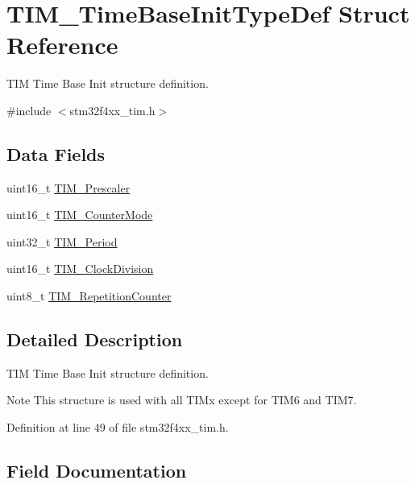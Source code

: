 \hypertarget{struct_t_i_m___time_base_init_type_def}{}\section{T\+I\+M\+\_\+\+Time\+Base\+Init\+Type\+Def Struct Reference}
\label{struct_t_i_m___time_base_init_type_def}


T\+IM Time Base Init structure definition.  




{\ttfamily \#include $<$stm32f4xx\+\_\+tim.\+h$>$}

\subsection*{Data Fields}
\begin{DoxyCompactItemize}
\item 
uint16\+\_\+t \hyperlink{struct_t_i_m___time_base_init_type_def_a30c6857997a4ddd7d3d66fd3a8907c37}{T\+I\+M\+\_\+\+Prescaler}
\item 
uint16\+\_\+t \hyperlink{struct_t_i_m___time_base_init_type_def_adfc97c66bfce30e74ce779ab04c156e9}{T\+I\+M\+\_\+\+Counter\+Mode}
\item 
uint32\+\_\+t \hyperlink{struct_t_i_m___time_base_init_type_def_a642ee05352126af48248167939742034}{T\+I\+M\+\_\+\+Period}
\item 
uint16\+\_\+t \hyperlink{struct_t_i_m___time_base_init_type_def_a2142bf86a7116c8c98ab015d5606fc98}{T\+I\+M\+\_\+\+Clock\+Division}
\item 
uint8\+\_\+t \hyperlink{struct_t_i_m___time_base_init_type_def_a121b27ced71ccb2c85f1d9825ae8d496}{T\+I\+M\+\_\+\+Repetition\+Counter}
\end{DoxyCompactItemize}


\subsection{Detailed Description}
T\+IM Time Base Init structure definition. 

\begin{DoxyNote}{Note}
This structure is used with all T\+I\+Mx except for T\+I\+M6 and T\+I\+M7. 
\end{DoxyNote}


Definition at line 49 of file stm32f4xx\+\_\+tim.\+h.



\subsection{Field Documentation}
\mbox{\label{struct_t_i_m___time_base_init_type_def_a2142bf86a7116c8c98ab015d5606fc98}} 
